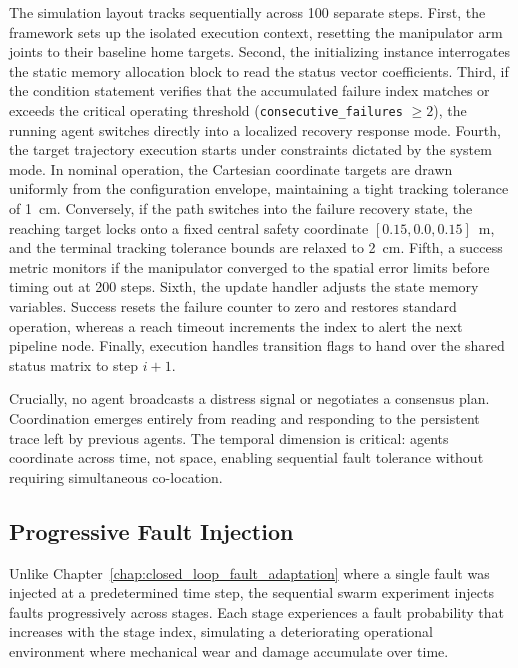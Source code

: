 \documentclass[12pt,a4paper,oneside]{report}
\begin{document}
The simulation layout tracks sequentially across 100 separate steps. First, the framework sets up the isolated execution context, resetting the manipulator arm joints to their baseline home targets. Second, the initializing instance interrogates the static memory allocation block to read the status vector coefficients. Third, if the condition statement verifies that the accumulated failure index matches or exceeds the critical operating threshold (\texttt{consecutive\_failures} $\ge 2$), the running agent switches directly into a localized recovery response mode. Fourth, the target trajectory execution starts under constraints dictated by the system mode. In nominal operation, the Cartesian coordinate targets are drawn uniformly from the configuration envelope, maintaining a tight tracking tolerance of 1~cm. Conversely, if the path switches into the failure recovery state, the reaching target locks onto a fixed central safety coordinate $[0.15, 0.0, 0.15]$~m, and the terminal tracking tolerance bounds are relaxed to 2~cm. Fifth, a success metric monitors if the manipulator converged to the spatial error limits before timing out at 200 steps. Sixth, the update handler adjusts the state memory variables. Success resets the failure counter to zero and restores standard operation, whereas a reach timeout increments the index to alert the next pipeline node. Finally, execution handles transition flags to hand over the shared status matrix to step $i+1$.

Crucially, no agent broadcasts a distress signal or negotiates a consensus plan. Coordination emerges entirely from reading and responding to the persistent trace left by previous agents. The temporal dimension is critical: agents coordinate across time, not space, enabling sequential fault tolerance without requiring simultaneous co-location.
\subsection{Progressive Fault Injection}
\label{subsec:progressive_fault_injection}

Unlike Chapter~\ref{chap:closed_loop_fault_adaptation} where a single fault was injected at a predetermined time step, the sequential swarm experiment injects faults progressively across stages. Each stage experiences a fault probability that increases with the stage index, simulating a deteriorating operational environment where mechanical wear and damage accumulate over time.
\end{document}
